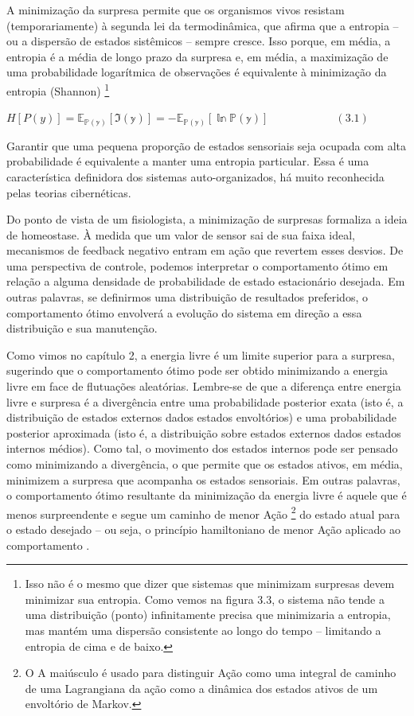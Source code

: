 \documentclass[
  12pt,
]{book}
\begin{document}
A minimização da surpresa permite que os organismos vivos resistam (temporariamente) à segunda lei da termodinâmica, que afirma que a entropia -- ou a dispersão de estados sistêmicos -- sempre cresce. Isso porque, em média, a entropia é a média de longo prazo da surpresa e, em média, a maximização de uma probabilidade logarítmica de observações é equivalente à minimização da entropia (Shannon) \footnote{Isso não é o mesmo que dizer que sistemas que minimizam surpresas devem minimizar sua entropia. Como vemos na figura 3.3, o sistema não tende a uma distribuição (ponto) infinitamente precisa que minimizaria a entropia, mas mantém uma dispersão consistente ao longo do tempo -- limitando a entropia de cima e de baixo.}

\(H[P(y)]=\mathbb{E_{P(y)}[ℑ(y)]}=-\mathbb{E_{P(y)}[\ln P(y)]}\qquad\qquad\qquad (3.1)\)

Garantir que uma pequena proporção de estados sensoriais seja ocupada com alta probabilidade é equivalente a manter uma entropia particular. Essa é uma característica definidora dos sistemas auto-organizados, há muito reconhecida pelas teorias cibernéticas.

Do ponto de vista de um fisiologista, a minimização de surpresas formaliza a ideia de homeostase. À medida que um valor de sensor sai de sua faixa ideal, mecanismos de feedback negativo entram em ação que revertem esses desvios. De uma perspectiva de controle, podemos interpretar o comportamento ótimo em relação a alguma densidade de probabilidade de estado estacionário desejada. Em outras palavras, se definirmos uma distribuição de resultados preferidos, o comportamento ótimo envolverá a evolução do sistema em direção a essa distribuição e sua manutenção.

Como vimos no capítulo 2, a energia livre é um limite superior para a surpresa, sugerindo que o comportamento ótimo pode ser obtido minimizando a energia livre em face de flutuações aleatórias. Lembre-se de que a diferença entre energia livre e surpresa é a divergência entre uma probabilidade posterior exata (isto é, a distribuição de estados externos dados estados envoltórios) e uma probabilidade posterior aproximada (isto é, a distribuição sobre estados externos dados estados internos médios). Como tal, o movimento dos estados internos pode ser pensado como minimizando a divergência, o que permite que os estados ativos, em média, minimizem a surpresa que acompanha os estados sensoriais. Em outras palavras, o comportamento ótimo resultante da minimização da energia livre é aquele que é menos surpreendente e segue um caminho de menor Ação \footnote{O A maiúsculo é usado para distinguir Ação como uma integral de caminho de uma Lagrangiana da ação como a dinâmica dos estados ativos de um envoltório de Markov.} do estado atual para o estado desejado -- ou seja, o princípio hamiltoniano de menor Ação aplicado ao comportamento .
\end{document}
